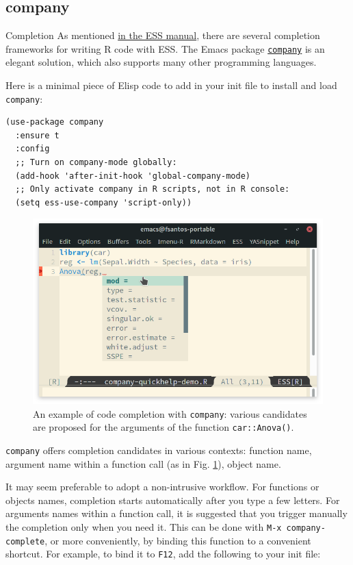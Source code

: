 \documentclass[presentation]{beamer}
\begin{document}
\subsection{company}
\label{sec:org8df5d2b}
\begin{frame}[fragile,allowframebreaks,label=]{Completion}
 As mentioned \href{https://ess.r-project.org/Manual/ess.html\#Completion}{in the ESS manual}, there are several completion frameworks for writing R code with ESS. The Emacs package \href{https://company-mode.github.io/}{\texttt{company}} is an elegant solution, which also supports many other programming languages.

Here is a minimal piece of Elisp code to add in your init file to install and load \texttt{company}:

\begin{verbatim}
(use-package company
  :ensure t
  :config
  ;; Turn on company-mode globally:
  (add-hook 'after-init-hook 'global-company-mode)
  ;; Only activate company in R scripts, not in R console:
  (setq ess-use-company 'script-only))
\end{verbatim}

\begin{figure}[htbp]
\centering
\includegraphics[width=0.72 \textwidth]{./images/company.png}
\caption{\label{fig:orgb66b93c}An example of code completion with \texttt{company}: various candidates are proposed for the arguments of the function \texttt{car::Anova()}.}
\end{figure}

\texttt{company} offers completion candidates in various contexts: function name, argument name within a function call (as in Fig. \ref{fig:orgb66b93c}), object name.

It may seem preferable to adopt a non-intrusive workflow. For functions or objects names, completion starts automatically after you type a few letters. For arguments names within a function call, it is suggested that you trigger manually the completion only when you need it. This can be done with \texttt{M-x company-complete}, or more conveniently, by binding this function to a convenient shortcut. For example, to bind it to \texttt{F12}, add the following to your init file:


\end{frame}
\end{document}
